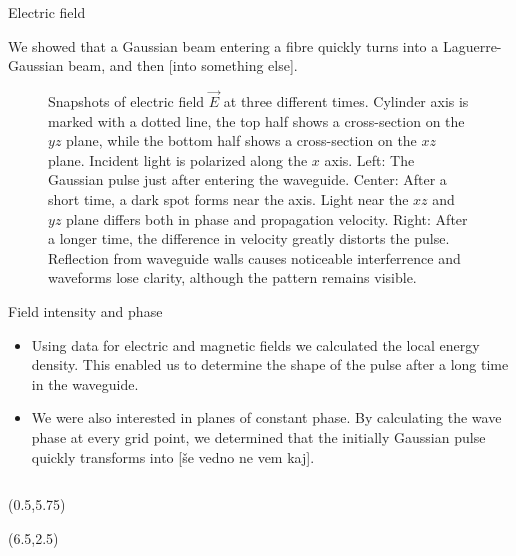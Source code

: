 \documentclass{beamer}
\newlength{\wideitemsep}
\let\olditem\item
\renewcommand{\item}{\setlength{\itemsep}{\wideitemsep}\olditem}
\newcommand{\blockpadding}{
  \rule[-0.6ex]{0pt}{2.5ex}
}
\begin{document}
\begin{columns}[t]
 \begin{column}{0.596\textwidth}
  \begin{block}{\blockpadding Electric field}
We showed that a Gaussian beam entering a fibre quickly turns into a Laguerre-Gaussian beam, and then [into something else]. 
\begin{figure}[h]
\centering
 \caption{Snapshots of electric field $\vec E$ at three different times. Cylinder axis is marked with a dotted line, the top half shows a cross-section on the $yz$ plane, while the bottom half shows a cross-section on the $xz$ plane. Incident light is polarized along the $x$ axis. {\color{dark} Left:} The Gaussian pulse just after entering the waveguide. {\color{dark} Center:} After a short time, a dark spot forms near the axis. Light near the $xz$ and $yz$ plane differs both in phase and propagation velocity. {\color{dark} Right:} After a longer time, the difference in velocity greatly distorts the pulse. Reflection from waveguide walls causes noticeable interferrence and waveforms lose clarity, although the pattern remains visible. }
\end{figure}

\end{block}
\begin{block}{\blockpadding Field intensity and phase}
\begin{itemize}
 \item Using data for electric and magnetic fields we calculated the local energy density. This enabled us to determine the shape of the pulse after a long time in the waveguide. 
 \item We were also interested in planes of constant phase. By calculating the wave phase at every grid point, we determined that the initially Gaussian pulse quickly transforms into [\v se vedno ne vem kaj]. 
\end{itemize}


\end{block}
 \end{column}

\end{columns}

\begin{textblock}{5.5}(0.5,5.75)
 

\end{textblock}

\begin{textblock}{8.5}(6.5,2.5)

\end{textblock}
\end{document}
